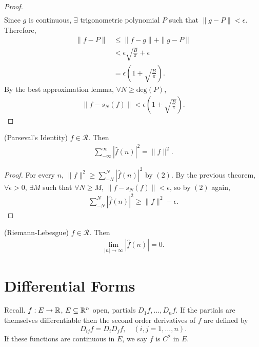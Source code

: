 \documentclass[11pt]{article}
\begin{document}
\begin{proof}
\begin{align*}
\end{align*} Since $g$ is continuous, $\exists$ trigonometric polynomial $P$ such that $\| g - P \| < \epsilon$. Therefore, \begin{align*} \| f - P \| & \le \| f - g \| + \| g - P \| \\ & < \epsilon \sqrt{ \frac{B}{\pi}} + \epsilon \\ & = \epsilon \left( 1 + \sqrt{ \frac{B}{\pi}} \right).
\end{align*} By the best approximation lemma, $\forall N \ge \mathrm{deg}(P)$, \begin{align*} \| f - s_N(f) \| < \epsilon \left( 1 + \sqrt{ \frac{B}{\pi}} \right).
\end{align*}
\end{proof}

\begin{corollary} (Parseval's Identity) $f \in \mathcal{R}$. Then \begin{align*} \sum_{-\infty}^\infty | \hat{f}(n) |^2 = \| f \|^2.
\end{align*}
\end{corollary}
\begin{proof} For every $n$, $\| f \|^2 \ge \sum_{-N}^N | \hat{f}(n) |^2$ by $(2)$. By the previous theorem, $\forall \epsilon > 0$, $\exists M$ such that $\forall N \ge M$, $\| f - s_N(f) \| < \epsilon$, so by $(2)$ again, \begin{align*} \sum_{-N}^N | \hat{f}(n) |^2 \ge \| f \|^2 - \epsilon.
\end{align*}
\end{proof}

\begin{corollary} (Riemann-Lebesgue) $f \in \mathcal{R}$. Then \begin{align*} \lim_{|n| \to \infty} | \hat{f}(n) | = 0.
\end{align*}
\end{corollary}

\newpage

\section{Differential Forms}

Recall. $f: E \to \mathbb{R}$, $E \subseteq \mathbb{R}^n$ open, partials $D_1f, \dots, D_nf$. If the partials are themselves differentiable then the second order derivatives of $f$ are defined by $$D_{ij}f = D_iD_jf, \quad (i, j = 1, \dots, n).$$ If these functions are continuous in $E$, we say $f$ is $C^2$ in $E$.
\end{document}
